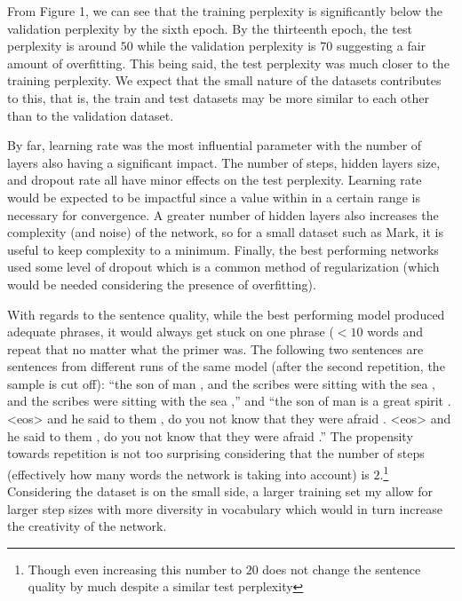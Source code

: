 \documentclass[a4paper]{article}
\begin{document}
From Figure 1, we can see that the training perplexity is significantly below
the validation perplexity by the sixth epoch.
By the thirteenth epoch, the test perplexity is around $50$ while the validation perplexity is $70$ suggesting a fair amount of
overfitting. This being said, the test perplexity was much closer to the training perplexity. We expect that the small nature of the datasets contributes to this, that is, the train and test datasets may be more similar to each other than to the validation dataset.

By far, learning rate was the most influential parameter with the number of layers also having a significant impact.
The number of steps, hidden layers size, and dropout rate all have minor effects on the test perplexity.
Learning rate would be expected to be impactful since a value within in a certain range is necessary for convergence.
A greater number of hidden layers also increases the complexity (and noise) of the network, so for a small dataset such as Mark, it is useful to keep complexity to a minimum.
Finally, the best performing networks used some level of dropout which
is a common method of regularization (which would be needed considering the presence of overfitting).

With regards to the sentence quality, while the best performing model produced
adequate phrases, it would always get stuck on one phrase ($<10$ words and repeat
that no matter what the primer was. The following two sentences are sentences from
different runs of the same model (after the second repetition, the sample is cut
off):
 ``the son of man , and the scribes were sitting with the sea , and the scribes were sitting with the sea ,''
 and 
``the son of man is a great spirit . \textless{}eos\textgreater{} and he said to them , do you not know that they were afraid . \textless{}eos\textgreater{} and he said to them , do you not know that they were afraid .''
The propensity towards repetition is not too surprising considering that the number
of steps (effectively how many words the network is taking into account) is
$2$.\footnote{Though even increasing this number to $20$ does not change the sentence
quality by much despite a similar test perplexity}
Considering the dataset is on the small side, a larger training set my allow for 
larger step sizes with more diversity in vocabulary which would in turn increase
the creativity of the network.
\end{document}
